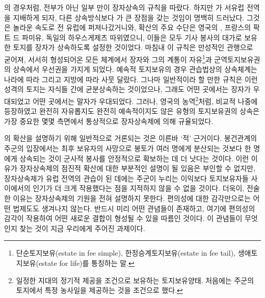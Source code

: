 의 경우처럼,
전부가 아닌 일부 만이 장자상속의 규칙을 따랐다.
하지만 가 서유럽 전역을 지배하게 되자,
다른 상속방식보다 가 큰 장점을 갖는 것임이 명백히 드러났다.
그것은 놀라운 속도로 전 유럽에 퍼져나갔거니와,
확산의 주요 수단은 영국의 ,
프랑스의 팍트 드 파미유,
독일의 하우스게제츠 따위였으니,
이들은 모두 기사 봉사의 대가로 보유한 토지를
장자가 상속하도록 설정한 것이었다.
마침내 이 규칙은 만성적인 관행으로 굳어져,
서서히 형성되어온 모든  체계에서
장자와 그의 계통이
자유\footnote{%
  단순토지보유(estate in fee simple),
  한정승계토지보유(estate in fee tail),
  생애토지보유(estate for life)를 통칭하는 말.
}과
군역토지보유권의 상속에서 우선권을 가지게 되었다.
예속적 토지보유의 경우 
관습법상의 상속체계는 나라에 따라 그리고 지방에 따라 사뭇 달랐다.
그나마 일반적이라 할 만한 규칙은 이런 성격의 토지는 자식들 간에
균분상속하는 것이었으나, 그래도 어떤 곳에서는
장자가 우대되었고 어떤 곳에서는 말자가 우대되었다.
그러나,
영국의 농역\footnote{%
  일정한 지대의 정기적 제공을 조건으로 보유하는 토지보유양태.
  처음에는 주군의 토지에서 특정 농사일을 제공하는 것을 조건으로 했다.
}처럼,
비교적 나중에 등장하였고 완전히 자유롭지도 완전히 예속적이지도 않은
유형의 토지보유권의 상속은 가장 중요한 몇몇 측면에서
통상적으로 장자상속제에 의해 규율되었다.

의 확산을 설명하기 위해 일반적으로 거론되는 것은
이른바 `적' 근거이다.
봉건관계의 주군의 입장에서는
최후 보유자의 사망으로
봉토가
여러 명에게 분산되는 것보다
한 명에게 상속되는 것이 군사적 봉사를 안정적으로 확보하는 데
더 낫다는 것이다.
이런 이유가 장자상속제의 점진적 확산에 대한 부분적인 설명이 될 있음은
부인할 수 없지만,
장자상속제가 유럽 전역의 관습이 된 데에는
주군이 누리는 이익보다 토지보유자들 사이에서의 인기가 더 크게
작용했다는 점을
지적하지 않을 수 없을 것이다.
더욱이, 전술한 이유는 장자상속제의 기원을 전혀 설명하지 못한다.
편의성에 대한 감각만으로는 어떤 법제도도 생겨나지 않는다.
반드시 미리 어떤 관념들이 존재하고, 여기에 편의성의 감각이 작용하여
어떤 새로운 결합이 형성될 수 있을 따름인 것이다.
이 관념들이 무엇인지 찾는 것이 지금 우리에게 주어진 과제이다.

